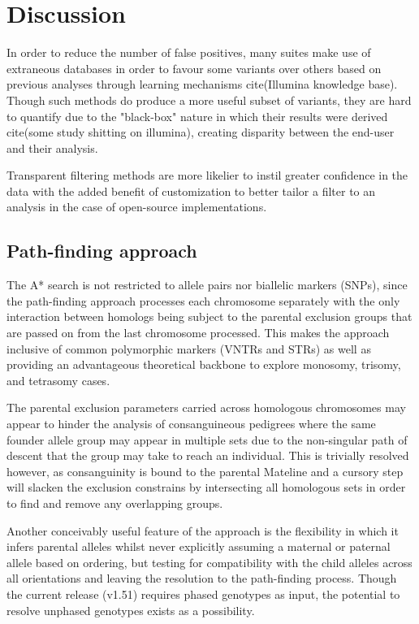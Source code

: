 \section{Discussion}

In order to reduce the number of false positives, many suites make use of extraneous databases in order to favour some variants over others based on previous analyses through learning mechanisms cite(Illumina knowledge base). Though such methods do produce a more useful subset of variants, they are hard to quantify due to the "black-box" nature in which their results were derived cite(some study shitting on illumina), creating disparity between the end-user and their analysis.

Transparent filtering methods are more likelier to instil greater confidence in the data with the added benefit of customization to better tailor a filter to an analysis in the case of open-source implementations.

\subsection{Path-finding approach}

The A* search is not restricted to allele pairs nor biallelic markers (SNPs), since the path-finding approach processes each chromosome separately with the only interaction between homologs being subject to the parental exclusion groups that are passed on from the last chromosome processed. This makes the approach inclusive of common polymorphic markers (VNTRs and STRs) as well as providing an advantageous theoretical backbone to explore monosomy, trisomy, and tetrasomy cases.

The parental exclusion parameters carried across homologous chromosomes may appear to hinder the analysis of consanguineous pedigrees where the same founder allele group may appear in multiple sets due to the non-singular path of descent that the group may take to reach an individual. This is trivially resolved however, as consanguinity is bound to the parental Mateline and a cursory step will slacken the exclusion constrains by intersecting all homologous sets in order to find and remove any overlapping groups.

Another conceivably useful feature of the approach is the flexibility in which it infers parental alleles whilst never explicitly assuming a maternal or paternal allele based on ordering, but testing for compatibility with the child alleles across all orientations and leaving the resolution to the path-finding process. Though the current \app release (v1.51) requires phased genotypes as input, the potential to resolve unphased genotypes exists as a possibility.


